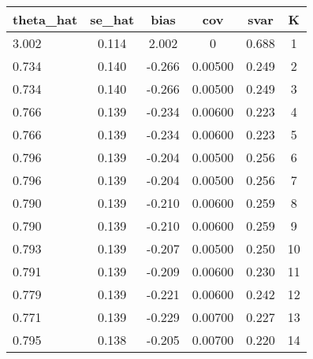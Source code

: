 
\begin{tabular}{lccccc} \hline
theta\_hat & se\_hat & bias & cov & svar & K \\ \hline
3.002 & 0.114 & 2.002 & 0 & 0.688 & 1 \\
0.734 & 0.140 & -0.266 & 0.00500 & 0.249 & 2 \\
0.734 & 0.140 & -0.266 & 0.00500 & 0.249 & 3 \\
0.766 & 0.139 & -0.234 & 0.00600 & 0.223 & 4 \\
0.766 & 0.139 & -0.234 & 0.00600 & 0.223 & 5 \\
0.796 & 0.139 & -0.204 & 0.00500 & 0.256 & 6 \\
0.796 & 0.139 & -0.204 & 0.00500 & 0.256 & 7 \\
0.790 & 0.139 & -0.210 & 0.00600 & 0.259 & 8 \\
0.790 & 0.139 & -0.210 & 0.00600 & 0.259 & 9 \\
0.793 & 0.139 & -0.207 & 0.00500 & 0.250 & 10 \\
0.791 & 0.139 & -0.209 & 0.00600 & 0.230 & 11 \\
0.779 & 0.139 & -0.221 & 0.00600 & 0.242 & 12 \\
0.771 & 0.139 & -0.229 & 0.00700 & 0.227 & 13 \\
 0.795 & 0.138 & -0.205 & 0.00700 & 0.220 & 14 \\ \hline
\end{tabular}

